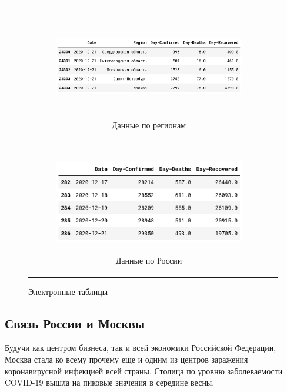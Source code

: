 \documentclass[a4paper, 12pt]{extarticle}
\begin{document}
\begin{figure}[h]
    \centering
    \begin{tabular}[c]{cc}
    \begin{subfigure}[b]{\textwidth} \centering
        \includegraphics[height=130pt]{../plots/regions_df2.png}
        \caption{Данные по регионам} \label{fig:regions_df2}
    \end{subfigure}& \\

    \begin{subfigure}[b]{\textwidth} \centering
        \includegraphics[height=130pt]{../plots/country_df2.png}
        \caption{Данные по России} \label{fig:country_df2}
    \end{subfigure}
    \end{tabular}
    \caption{Электронные таблицы} \label{fig:collection2_res}
\end{figure}
\newpage

\subsection{Связь России и Москвы}

Будучи как центром бизнеса, так и всей экономики Российской Федерации, Москва
стала ко всему прочему еще и одним из центров заражения коронавирусной
инфекцией всей страны. Столица по уровню заболеваемости COVID-19 вышла на пиковые
значения в середине весны.
\\
\end{document}
